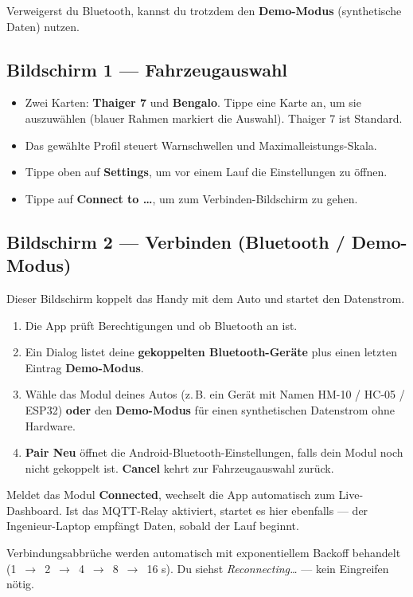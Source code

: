 \documentclass[11pt,a4paper,oneside]{report}
\newcommand{\arrow}{\,$\rightarrow$\,}
\begin{document}
\medskip
Verweigerst du Bluetooth, kannst du trotzdem den \textbf{Demo-Modus}
(synthetische Daten) nutzen.

\subsection{Bildschirm 1 --- Fahrzeugauswahl}
\begin{itemize}
  \item Zwei Karten: \textbf{Thaiger 7} und \textbf{Bengalo}. Tippe eine Karte an,
    um sie auszuw\"ahlen (blauer Rahmen markiert die Auswahl). Thaiger 7 ist
    Standard.
  \item Das gew\"ahlte Profil steuert Warnschwellen und Maximalleistungs-Skala.
  \item Tippe oben auf \textbf{Settings}, um vor einem Lauf die Einstellungen zu
    \"offnen.
  \item Tippe auf \textbf{Connect to \ldots}, um zum Verbinden-Bildschirm zu gehen.
\end{itemize}

\subsection{Bildschirm 2 --- Verbinden (Bluetooth / Demo-Modus)}
Dieser Bildschirm koppelt das Handy mit dem Auto und startet den Datenstrom.
\begin{enumerate}
  \item Die App pr\"uft Berechtigungen und ob Bluetooth an ist.
  \item Ein Dialog listet deine \textbf{gekoppelten Bluetooth-Ger\"ate} plus einen
    letzten Eintrag \textbf{Demo-Modus}.
  \item W\"ahle das Modul deines Autos (z.\,B. ein Ger\"at mit Namen HM-10 / HC-05
    / ESP32) \textbf{oder} den \textbf{Demo-Modus} f\"ur einen synthetischen
    Datenstrom ohne Hardware.
  \item \textbf{Pair Neu} \"offnet die Android-Bluetooth-Einstellungen, falls dein
    Modul noch nicht gekoppelt ist. \textbf{Cancel} kehrt zur Fahrzeugauswahl
    zur\"uck.
\end{enumerate}
Meldet das Modul \textbf{Connected}, wechselt die App automatisch zum
Live-Dashboard. Ist das MQTT-Relay aktiviert, startet es hier ebenfalls --- der
Ingenieur-Laptop empf\"angt Daten, sobald der Lauf beginnt.
\begin{tgnote}
Verbindungsabbr\"uche werden automatisch mit exponentiellem Backoff behandelt
(1 \arrow{} 2 \arrow{} 4 \arrow{} 8 \arrow{} 16 s). Du siehst
\emph{Reconnecting\ldots} --- kein Eingreifen n\"otig.
\end{tgnote}
\end{document}

